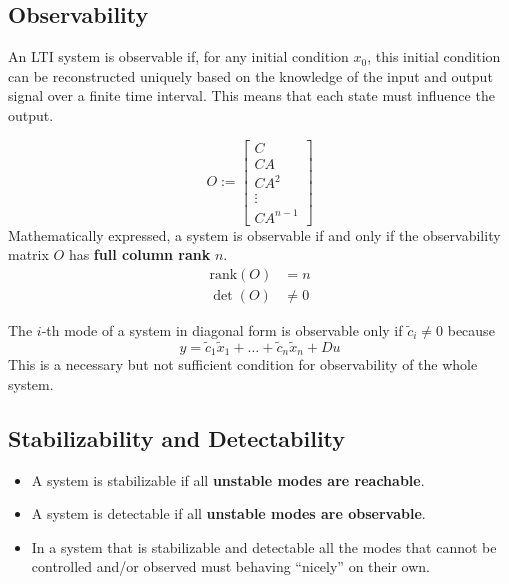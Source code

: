 

\subsection{Observability}

An LTI system is observable if, for any initial condition $x_0$, this initial condition can be reconstructed uniquely based on the knowledge of the input and output signal over a finite time interval. This means that each state must influence the output.

\begin{equation*}
    O:= \begin{bmatrix}
        C      \\
        CA     \\
        CA^2   \\
        \vdots \\
        CA^{n-1}
    \end{bmatrix}
\end{equation*}
Mathematically expressed, a system is observable if and only if the observability matrix $O$ has \textbf{full column rank} $n$.
\begin{align*}
    \text{rank}(O) & = n    \\
    \det(O)        & \neq 0
\end{align*}


The $i$-th mode of a system in diagonal form is observable only if $\tilde{c}_i \neq 0$ because
\begin{equation*}
    y=\tilde{c}_1\tilde{x}_1+\ldots+\tilde{c}_n\tilde{x}_n+Du
\end{equation*}
This is a necessary but not sufficient condition for observability of the whole system.

\subsection{Stabilizability and Detectability}
\begin{itemize}
    \item A system is stabilizable if all \textbf{unstable modes are reachable}.
    \item A system is detectable if all \textbf{unstable modes are observable}.
    \item In a system that is stabilizable and detectable all the modes that cannot be controlled and/or observed must behaving ``nicely'' on their own.
\end{itemize}

